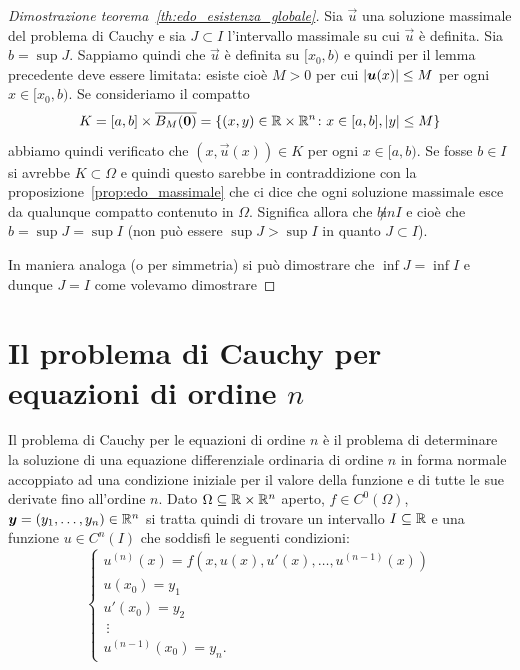 \begin{proof}[Dimostrazione teorema~\ref{th:edo_esistenza_globale}]
Sia $\vec u$ una soluzione massimale del problema di Cauchy e sia
$J\subset I$ l'intervallo massimale su cui $\vec u$ è definita.
Sia $b=\sup J$. Sappiamo quindi che $\vec u$ è definita su $[x_0,b)$
e quindi per il lemma precedente deve essere limitata: esiste cioè
$M>0$ per cui ${\left|\boldsymbol u(x)\right|}\le M$ per ogni $x\in[x_0,b)$.
Se consideriamo il compatto
\[
K=[a,b] \times \overline{B_M(\boldsymbol 0)}
 = {\left\{ (x,y)\in \mathbb R \times \mathbb R^n\colon x\in [a,b], {\left|y\right|}\le M \right\}}
\]
abbiamo quindi verificato che $(x,\vec u(x))\in K$ per ogni $x\in [a,b)$.
Se fosse $b\in I$ si avrebbe $K\subset \Omega$ e quindi questo sarebbe
in contraddizione con la proposizione~\ref{prop:edo_massimale} che
ci dice che ogni soluzione massimale esce da qualunque compatto contenuto
in $\Omega$. Significa allora che $b\not in I$ e cioè che $b = \sup J = \sup I$
(non può essere $\sup J>\sup I$ in quanto $J\subset I$).

In maniera analoga (o per simmetria) si può dimostrare che $\inf J=\inf I$
e dunque $J=I$ come volevamo dimostrare
\end{proof}

\section{Il problema di Cauchy per equazioni di ordine $n$}

Il problema di Cauchy per le equazioni di ordine $n$ è il problema di
determinare la soluzione di una equazione differenziale ordinaria di ordine $n$
in forma normale accoppiato ad una condizione iniziale per il valore della
funzione e di tutte le sue derivate fino all'ordine $n$.
Dato $\Omega\subseteq \mathbb R\times \mathbb R^n$ aperto, $f\in C^0(\Omega)$,
$\boldsymbol y = (y_1, \dots, y_n) \in \mathbb R^n$
si tratta quindi di trovare un intervallo $I\subseteq \mathbb R$ e una funzione
$u\in C^n(I)$ che soddisfi le seguenti condizioni:
\begin{equation}\label{eq:problema_cauchy_ordine_n}
  \begin{cases}
    u^{(n)}(x) = f(x,u(x), u'(x), \dots, u^{(n-1)}(x))\\
    u(x_0) = y_1 \\
    u'(x_0) = y_2 \\
    \ \vdots \\
    u^{(n-1)}(x_0) = y_n.
  \end{cases}
\end{equation}

